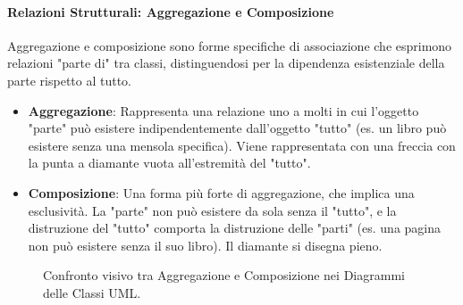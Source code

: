\paragraph{Relazioni Strutturali: Aggregazione e Composizione}
Aggregazione e composizione sono forme specifiche di associazione che esprimono relazioni "parte di" tra classi, distinguendosi per la dipendenza esistenziale della parte rispetto al tutto.
\begin{itemize}
    \item \textbf{Aggregazione}: Rappresenta una relazione uno a molti in cui l'oggetto "parte" può esistere indipendentemente dall'oggetto "tutto" (es. un libro può esistere senza una mensola specifica). Viene rappresentata con una freccia con la punta a diamante vuota all'estremità del "tutto".
    \item \textbf{Composizione}: Una forma più forte di aggregazione, che implica una esclusività. La "parte" non può esistere da sola senza il "tutto", e la distruzione del "tutto" comporta la distruzione delle "parti" (es. una pagina non può esistere senza il suo libro). Il diamante si disegna pieno.
\end{itemize}
\begin{figure}[h!]
    \centering
    \quad
    \caption{Confronto visivo tra Aggregazione e Composizione nei Diagrammi delle Classi UML.}
    \label{fig:class_aggregazione_composizione}
\end{figure}

